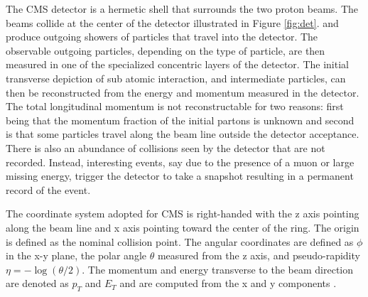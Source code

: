 The CMS detector is a hermetic shell that surrounds the two proton beams. The beams collide at the center of the detector illustrated in Figure \ref{fig:det}. and produce outgoing showers of particles that travel into the detector. The observable outgoing particles, depending on the type of particle, are then measured in one of the specialized concentric layers of the detector. The initial transverse depiction of sub atomic interaction, and intermediate particles, can then be reconstructed from the energy and momentum measured in the detector. The total longitudinal momentum is not reconstructable for two reasons: first being that the momentum fraction of the initial partons is unknown and second is that some particles travel along the beam line outside the detector acceptance.  There is also an abundance of collisions seen by the detector that are not recorded. Instead, interesting events, say due to the presence of a muon or large missing energy, trigger the detector to take a snapshot resulting in a permanent record of the event.

The coordinate system adopted for CMS is right-handed with the z axis pointing along the beam line and x axis pointing toward the center of the ring. The origin is defined as the nominal collision point. The angular coordinates are defined as $\phi$ in the x-y plane, the polar angle $\theta$ measured from the z axis, and pseudo-rapidity $\eta =-\log(\theta/2)$. The momentum and energy transverse to the beam direction are denoted as $p_T$ and $E_T$ and are computed from the x and y components \cite{CMS:2017lum}. 

